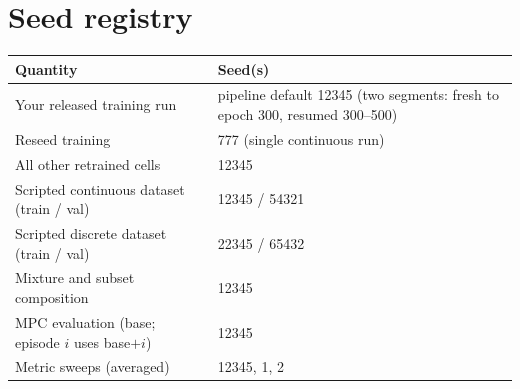 \documentclass[11pt]{article}
\begin{document}
\section{Seed registry}\label{appendix-b-seed-registry}

\begin{longtable}[]{@{}ll@{}}
\toprule\noalign{}
Quantity & Seed(s) \\
\midrule\noalign{}
\endhead
\bottomrule\noalign{}
\endlastfoot
Your released training run & pipeline default 12345 (two segments:
fresh to epoch 300, resumed 300--500) \\
Reseed training & 777 (single continuous run) \\
All other retrained cells & 12345 \\
Scripted continuous dataset (train / val) & 12345 / 54321 \\
Scripted discrete dataset (train / val) & 22345 / 65432 \\
Mixture and subset composition & 12345 \\
MPC evaluation (base; episode \(i\) uses base\(+i\)) & 12345 \\
Metric sweeps (averaged) & 12345, 1, 2 \\
\end{longtable}
\end{document}
